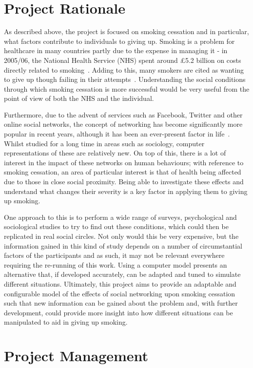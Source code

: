 \documentclass[]{report}
\begin{document}
\section{Project Rationale}
As described above, the project is focused on smoking cessation and in particular, what factors contribute to individuals to giving up. Smoking is a problem for healthcare in many countries partly due to the expense in managing it - in 2005/06, the National Health Service (NHS) spent around \pounds5.2 billion on costs directly related to smoking~\cite{NHS-78}. Adding to this, many smokers are cited as wanting to give up though failing in their attempts~\cite{NHS-44}. Understanding the social conditions through which smoking cessation is more successful would be very useful from the point of view of both the NHS and the individual.

Furthermore, due to the advent of services such as Facebook, Twitter and other online social networks, the concept of networking has become significantly more popular in recent years, although it has been an ever-present factor in life~\cite{USN-4}. Whilst studied for a long time in areas such as sociology, computer representations of these are relatively new. On top of this, there is a lot of interest in the impact of these networks on human behaviours; with reference to smoking cessation, an area of particular interest is that of health being affected due to those in close social proximity. Being able to investigate these effects and understand what changes their severity is a key factor in applying them to giving up smoking.

One approach to this is to perform a wide range of surveys, psychological and sociological studies to try to find out these conditions, which could then be replicated in real social circles. Not only would this be very expensive, but the information gained in this kind of study depends on a number of circumstantial factors of the participants and as such, it may not be relevant everywhere requiring the re-running of this work. Using a computer model presents an alternative that, if developed accurately, can be adapted and tuned to simulate different situations. Ultimately, this project aims to provide an adaptable and configurable model of the effects of social networking upon smoking cessation such that new information can be gained about the problem and, with further development, could provide more insight into how different situations can be manipulated to aid in giving up smoking.

\section{Project Management}
\end{document}

